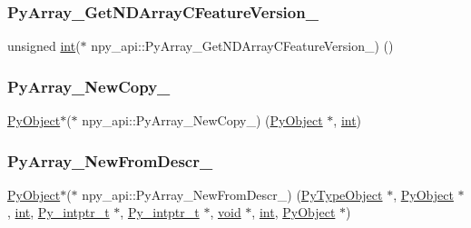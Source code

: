 \subsubsection{\texorpdfstring{PyArray\_GetNDArrayCFeatureVersion\_}{PyArray\_GetNDArrayCFeatureVersion\_}}
{\footnotesize\ttfamily unsigned \mbox{\hyperlink{warnings_8h_a74f207b5aa4ba51c3a2ad59b219a423b}{int}}($\ast$ npy\+\_\+api\+::\+Py\+Array\+\_\+\+Get\+N\+D\+Array\+C\+Feature\+Version\+\_\+) ()}

\mbox{\label{structnpy__api_afceedb3de54ec824ebe1904f2518c178}} 
\subsubsection{\texorpdfstring{PyArray\_NewCopy\_}{PyArray\_NewCopy\_}}
{\footnotesize\ttfamily \mbox{\hyperlink{_python27_2object_8h_aadc84ac7aed2cfa6f20c25f62bf3dac7}{Py\+Object}}$\ast$($\ast$ npy\+\_\+api\+::\+Py\+Array\+\_\+\+New\+Copy\+\_\+) (\mbox{\hyperlink{_python27_2object_8h_aadc84ac7aed2cfa6f20c25f62bf3dac7}{Py\+Object}} $\ast$, \mbox{\hyperlink{warnings_8h_a74f207b5aa4ba51c3a2ad59b219a423b}{int}})}

\mbox{\label{structnpy__api_a011738372f87b4f5c55438b36363d0e7}} 
\subsubsection{\texorpdfstring{PyArray\_NewFromDescr\_}{PyArray\_NewFromDescr\_}}
{\footnotesize\ttfamily \mbox{\hyperlink{_python27_2object_8h_aadc84ac7aed2cfa6f20c25f62bf3dac7}{Py\+Object}}$\ast$($\ast$ npy\+\_\+api\+::\+Py\+Array\+\_\+\+New\+From\+Descr\+\_\+) (\mbox{\hyperlink{_python27_2object_8h_a42a55dd6e973872c7a6bc61632070f6f}{Py\+Type\+Object}} $\ast$, \mbox{\hyperlink{_python27_2object_8h_aadc84ac7aed2cfa6f20c25f62bf3dac7}{Py\+Object}} $\ast$, \mbox{\hyperlink{warnings_8h_a74f207b5aa4ba51c3a2ad59b219a423b}{int}}, \mbox{\hyperlink{pyport_8h_abd3f9942a9af5f7423b51d51992df0ac}{Py\+\_\+intptr\+\_\+t}} $\ast$, \mbox{\hyperlink{pyport_8h_abd3f9942a9af5f7423b51d51992df0ac}{Py\+\_\+intptr\+\_\+t}} $\ast$, \mbox{\hyperlink{_s_d_l__opengles2__gl2ext_8h_ae5d8fa23ad07c48bb609509eae494c95}{void}} $\ast$, \mbox{\hyperlink{warnings_8h_a74f207b5aa4ba51c3a2ad59b219a423b}{int}}, \mbox{\hyperlink{_python27_2object_8h_aadc84ac7aed2cfa6f20c25f62bf3dac7}{Py\+Object}} $\ast$)}

